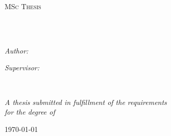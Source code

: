 \documentclass[
11pt, %
english, %
singlespacing, %
headsepline, %
]{MastersDoctoralThesis} %
\author{Francois \textsc{Berrier}} %
\begin{document}
\frontmatter %

\pagestyle{plain} %


\begin{titlepage}
\begin{center}

\vspace*{.06\textheight}
{\scshape\LARGE \univname\par}\vspace{1.5cm} %
\textsc{\Large MSc Thesis}\\[0.5cm] %

\HRule \\[0.4cm] %
{\huge \bfseries \ttitle\par}\vspace{0.4cm} %
\HRule \\[1.5cm] %
 
\begin{minipage}[t]{0.4\textwidth}
\begin{flushleft} \large
\emph{Author:}\\
\href{francois.berrier@cantab.net}{\authorname} %
\end{flushleft}
\end{minipage}
\begin{minipage}[t]{0.4\textwidth}
\begin{flushright} \large
\emph{Supervisor:} \\
\href{https://www.cs.rhul.ac.uk/~chrisw/}{\supname} %
\end{flushright}
\end{minipage}\\[3cm]
 
\vfill

\large \textit{A thesis submitted in fulfillment of the requirements\\ for the degree of \degreename}\\[0.3cm] %
 
\vfill

{\large \today}\\[4cm] %
 
\vfill
\end{center}
\end{titlepage}
\end{document}

